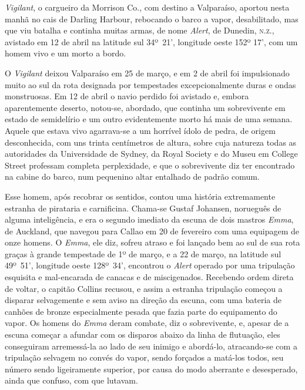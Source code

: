 \emph{Vigilant}, o cargueiro da Morrison Co., com destino a Valparaíso,
aportou nesta manhã no cais de Darling Harbour, rebocando o barco a
vapor, desabilitado, mas que viu batalha e continha muitas armas, de
nome \emph{Alert}, de Dunedin, \textsc{n.z.}, avistado em 12 de abril na latitude
sul 34º~21', longitude oeste 152º 17', com um homem vivo e um morto a bordo.

O \emph{Vigilant} deixou Valparaíso em 25 de março, e em 2 de abril foi
impulsionado muito ao sul da rota designada por tempestades
excepcionalmente duras e ondas monstruosas. Em 12 de abril o navio
perdido foi avistado e, embora aparentemente deserto, notou-se,
abordado, que continha um sobrevivente em estado de semidelírio e um
outro evidentemente morto há mais de uma semana. Aquele que estava vivo
agarrava-se a um horrível ídolo de pedra, de origem desconhecida, com
uns trinta centímetros de altura, sobre cuja natureza todas as
autoridades da Universidade de Sydney, da Royal Society e do Museu em
College Street professam completa perplexidade, e que o sobrevivente diz
ter encontrado na cabine do barco, num pequenino altar entalhado de
padrão comum.

Esse homem, após recobrar os sentidos, contou uma história extremamente
estranha de pirataria e carnificina. Chama-se Gustaf Johansen, norueguês
de alguma inteligência, e era o segundo imediato da escuna de dois
mastros \emph{Emma}, de Auckland, que navegou para Callao em 20 de
fevereiro com uma equipagem de onze homens. O \emph{Emma}, ele diz,
sofreu atraso e foi lançado bem ao sul de sua rota graças à grande
tempestade de 1º de março, e a 22 de março, na
latitude sul 49º~51', longitude
oeste 128º~34', encontrou o \emph{Alert} operado por uma tripulação
esquisita e mal-encarada de canacas e de miscigenados. Recebendo ordem
direta de voltar, o capitão Collins recusou, e assim a estranha
tripulação começou a disparar selvagemente e sem aviso na direção da
escuna, com uma bateria de canhões de bronze especialmente pesada que
fazia parte do equipamento do vapor. Os homens do \emph{Emma} deram
combate, diz o sobrevivente, e, apesar de a escuna começar a afundar com
os disparos abaixo da linha de flutuação, eles conseguiram arremessá-la
ao lado de seu inimigo e abordá-lo, atracando-se com a tripulação
selvagem no convés do vapor, sendo forçados a matá-los todos, seu número
sendo ligeiramente superior, por causa do modo aberrante e desesperado,
ainda que confuso, com que lutavam.

